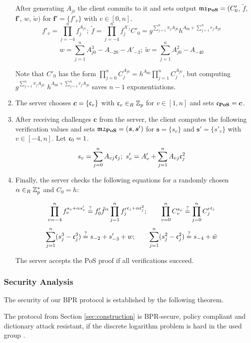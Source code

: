 \begin{enumerate}
\noindent
After generating $A_{ji}$ the client commits to it and sets output $\mathfrak{m1}_\mathsf{\bf PoS}=(C'_0$, $\tilde{f}$, $\bm f'$, $w$, $\tilde{w})$ for $\bm f'=\{f'_v\}$ with $v\in[0,n]$.
\[ 
 f'_v=\prod_{j=-4}^{n} f_j^{A_{jv}};~ \tilde{f}=\prod_{j=-4}^{n} f_j^{A'_{j}}
 C'_0=g^{\sum_{j=1}^{n} \pi_j A_{j0}} h^{A_{00}+\sum_{j=1}^{n} r_jA_{j0}}
\] 
\[w=\sum_{j=1}^n A_{j0}^3-A_{-20}-A'_{-3};~ \tilde{w}=\sum_{j=1}^n A_{j0}^2 - A_{-40} \]

\noindent
Note that $C'_0$ has the form $\prod_{j=0}^n C_j^{A_{j0}}=h^{A_{00}}\prod_{j=1}^n C_j^{A_{j0}}$, but computing $g^{\sum_{j=1}^{n} \pi_j A_{j0}}$ $h^{A_{00}+\sum_{j=1}^{n} r_jA_{j0}}$ saves $n-1$ exponentiations.


\item The server chooses $\bm c = \{\mathfrak{c}_v\}$ with $\mathfrak{c}_v\in_R\mathbb{Z}_p$ for $v\in[1,n]$ and sets $\mathfrak{c}_\mathsf{\bf PoS}=\bm c$.

\item After receiving challenges $\bm c$ from the server, the client computes the following verification values and sets \allowbreak $\mathfrak{m2}_\mathsf{\bf PoS}=(\bm s, \bm s')$ for $\bm s = \{s_v\}$ and $\bm s' = \{s'_v\}$ with $v\in[-4,n]$.
Let $\mathfrak{c}_0=1$.
\[ s_v = \sum_{j=0}^{n} A_{vj}\mathfrak{c}_j;~ s'_v = A'_v + \sum_{j=1}^{n} A_{vj}\mathfrak{c}_j^2 \] %


\item Finally, the server checks the following equations for a randomly chosen $\alpha\in_R\mathbb{Z}^\ast_p$ and $C_0=h$:

\[  \prod_{v=-4}^{n} f_v^{s_v+\alpha s'_v} \stackrel{?}{=} f'_0\tilde{f}^\alpha \prod_{j=1}^n {f'_j}^{\mathfrak{c}_j+\alpha \mathfrak{c}_j^2};\hspace*{2em}
    \prod_{v=0}^n C_v^{s_v} \stackrel{?}{=} \prod_{j=0}^n {C'_j}^{\mathfrak{c}_j} \]
\[  \sum_{j=1}^n (s_j^3 - \mathfrak{c}_j^3) \stackrel{?}{=} s_{-2} + s'_{-3} + w;\hspace*{2em}
    \sum_{j=1}^n (s_j^2 - \mathfrak{c}_j^2) \stackrel{?}{=} s_{-4} + \tilde{w} \]

\noindent
The server accepts the \ac{PoS} proof if all verifications succeed.
\end{enumerate}

\subsubsection{Security Analysis}
The security of our \ac{BPR} protocol is established by the following theorem. 

\begin{theorem}\label{theo:bpr}
  The protocol from Section \ref{sec:construction} is \ac{BPR}-secure, \ie policy compliant and dictionary attack resistant, if the discrete logarithm problem is hard in the used group \GG.
\end{theorem}

